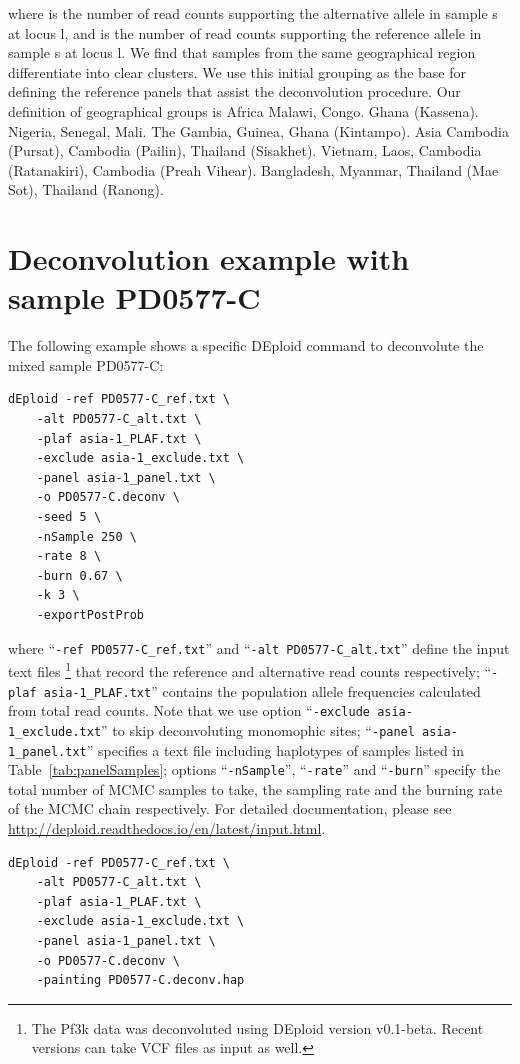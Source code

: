 \documentclass{article}
\begin{document}
where  is the number of read counts supporting the alternative allele in sample s at locus l, and  is the number of read counts supporting the reference allele in sample s at locus l.
We find that samples from the same geographical region differentiate into clear clusters. We use this initial grouping as the base for defining the reference panels that assist the deconvolution procedure. Our definition of geographical groups is
Africa
Malawi, Congo.
Ghana (Kassena).
Nigeria, Senegal, Mali.
The Gambia, Guinea, Ghana (Kintampo).
Asia
Cambodia (Pursat), Cambodia (Pailin), Thailand (Sisakhet).
Vietnam, Laos, Cambodia (Ratanakiri), Cambodia (Preah Vihear).
Bangladesh, Myanmar, Thailand (Mae Sot), Thailand (Ranong).

\newpage


\section{Deconvolution example with sample PD0577-C}

The following example shows a specific {\textmd DEploid} command to deconvolute the mixed sample {\textmd PD0577-C}:
\linespread{1}
\begin{lstlisting}
dEploid -ref PD0577-C_ref.txt \
    -alt PD0577-C_alt.txt \
    -plaf asia-1_PLAF.txt \
    -exclude asia-1_exclude.txt \
    -panel asia-1_panel.txt \
    -o PD0577-C.deconv \
    -seed 5 \
    -nSample 250 \
    -rate 8 \
    -burn 0.67 \
    -k 3 \
    -exportPostProb
\end{lstlisting}
\linespread{1.5}
where ``{\tt -ref PD0577-C\_ref.txt}'' and ``{\tt -alt PD0577-C\_alt.txt}'' define the input text files \footnote{The Pf3k data was deconvoluted using DEploid version v0.1-beta. Recent versions can take VCF files as input as well.} that record the reference and alternative read counts respectively; ``{\tt -plaf asia-1\_PLAF.txt}'' contains the population allele frequencies calculated from total read counts. Note that we use option ``{\tt -exclude asia-1\_exclude.txt}'' to skip deconvoluting monomophic sites; ``{\tt -panel asia-1\_panel.txt}'' specifies a text file including haplotypes of samples listed in Table~\ref{tab:panelSamples}; options ``{\tt -nSample}'', ``{\tt -rate}'' and ``{\tt -burn}'' specify the total number of MCMC samples to take, the sampling rate and the burning rate of the MCMC chain respectively. For detailed documentation, please see \url{http://deploid.readthedocs.io/en/latest/input.html}.

\linespread{1}
\begin{lstlisting}
dEploid -ref PD0577-C_ref.txt \
    -alt PD0577-C_alt.txt \
    -plaf asia-1_PLAF.txt \
    -exclude asia-1_exclude.txt \
    -panel asia-1_panel.txt \
    -o PD0577-C.deconv \
    -painting PD0577-C.deconv.hap
\end{lstlisting}
\linespread{1.5}
\end{document}
